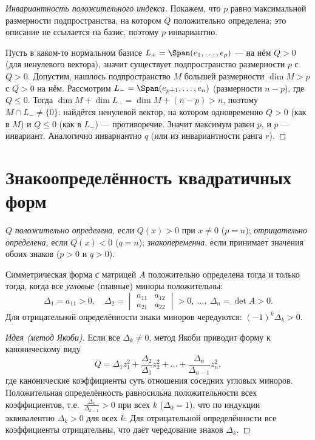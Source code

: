 \begin{proof}[Инвариантность положительного индекса]
Покажем, что $p$ равно максимальной размерности подпространства, на котором $Q$ положительно
определена; это описание не ссылается на базис, поэтому $p$ инвариантно.

Пусть в каком-то нормальном базисе $L_+=\Span(e_1,\dots,e_p)$ — на нём $Q>0$ (для ненулевого
вектора), значит существует подпространство размерности $p$ с $Q>0$. Допустим, нашлось
подпространство $M$ большей размерности $\dim M>p$ с $Q>0$ на нём. Рассмотрим
$L_-=\Span(e_{p+1},\dots,e_n)$ (размерности $n-p$), где $Q\le0$. Тогда
$\dim M+\dim L_-=\dim M+(n-p)>n$, поэтому $M\cap L_-\ne\{0\}$: найдётся ненулевой вектор, на котором
одновременно $Q>0$ (как в $M$) и $Q\le0$ (как в $L_-$) — противоречие. Значит максимум равен $p$, и
$p$ — инвариант. Аналогично инвариантно $q$ (или из инвариантности ранга $r$).
\end{proof}

\section{Знакоопределённость квадратичных форм}

\begin{definition}
$Q$ \emph{положительно определена}, если $Q(x)>0$ при $x\ne0$ ($p=n$); \emph{отрицательно
определена}, если $Q(x)<0$ ($q=n$); \emph{знакопеременна}, если принимает значения обоих знаков
($p>0$ и $q>0$).
\end{definition}

\begin{theorem}
Симметрическая форма с матрицей $A$ положительно определена тогда и только тогда, когда все
\emph{угловые} (главные) миноры положительны:
\[
  \Delta_1=a_{11}>0,\quad\Delta_2=\begin{vmatrix}a_{11}&a_{12}\\a_{21}&a_{22}\end{vmatrix}>0,\ \dots,\ \Delta_n=\det A>0 .
\]
Для отрицательной определённости знаки миноров чередуются: $(-1)^k\Delta_k>0$.
\end{theorem}

\begin{proof}[Идея (метод Якоби)]
Если все $\Delta_k\ne0$, метод Якоби приводит форму к каноническому виду
\[
  Q=\Delta_1 z_1^2+\frac{\Delta_2}{\Delta_1}z_2^2+\dots+\frac{\Delta_n}{\Delta_{n-1}}z_n^2 ,
\]
где канонические коэффициенты суть отношения соседних угловых миноров. Положительная определённость
равносильна положительности всех коэффициентов, т.е.\ $\tfrac{\Delta_k}{\Delta_{k-1}}>0$ при всех
$k$ ($\Delta_0=1$), что по индукции эквивалентно $\Delta_k>0$ для всех $k$. Для отрицательной
определённости все коэффициенты отрицательны, что даёт чередование знаков $\Delta_k$.
\end{proof}
